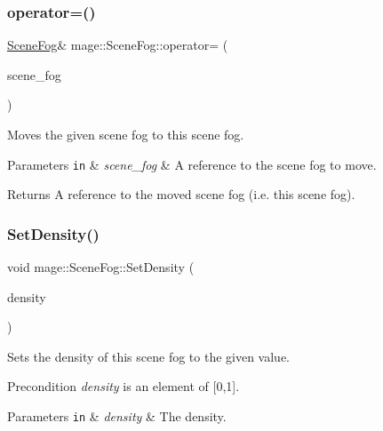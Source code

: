 \subsubsection{\texorpdfstring{operator=()}{operator=()}\hspace{0.1cm}{\footnotesize\ttfamily [2/2]}}
{\footnotesize\ttfamily \hyperlink{classmage_1_1_scene_fog}{Scene\+Fog}\& mage\+::\+Scene\+Fog\+::operator= (\begin{DoxyParamCaption}\item[{\hyperlink{classmage_1_1_scene_fog}{Scene\+Fog} \&\&}]{scene\+\_\+fog }\end{DoxyParamCaption})\hspace{0.3cm}{\ttfamily [default]}}

Moves the given scene fog to this scene fog.


\begin{DoxyParams}[1]{Parameters}
\mbox{\tt in}  & {\em scene\+\_\+fog} & A reference to the scene fog to move. \\
\hline
\end{DoxyParams}
\begin{DoxyReturn}{Returns}
A reference to the moved scene fog (i.\+e. this scene fog). 
\end{DoxyReturn}
\hypertarget{classmage_1_1_scene_fog_a35df66af255b6d274d7048e17b15bcb6}{}\label{classmage_1_1_scene_fog_a35df66af255b6d274d7048e17b15bcb6} 
\subsubsection{\texorpdfstring{Set\+Density()}{SetDensity()}}
{\footnotesize\ttfamily void mage\+::\+Scene\+Fog\+::\+Set\+Density (\begin{DoxyParamCaption}\item[{\hyperlink{namespacemage_aa97e833b45f06d60a0a9c4fc22ae02c0}{F32}}]{density }\end{DoxyParamCaption})\hspace{0.3cm}{\ttfamily [noexcept]}}

Sets the density of this scene fog to the given value.

\begin{DoxyPrecond}{Precondition}
{\itshape density} is an element of \mbox{[}0,1\mbox{]}. 
\end{DoxyPrecond}

\begin{DoxyParams}[1]{Parameters}
\mbox{\tt in}  & {\em density} & The density. \\
\hline
\end{DoxyParams}


